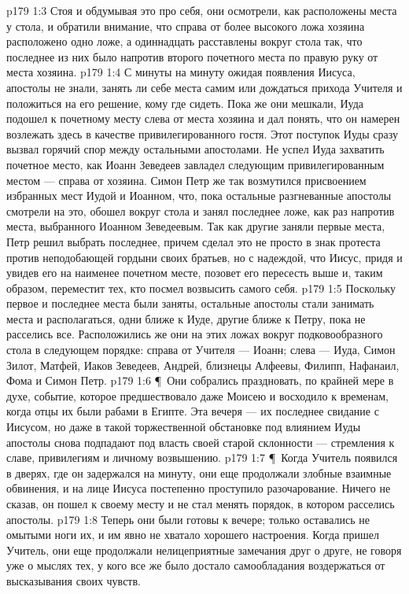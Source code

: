 \vs p179 1:3 Стоя и обдумывая это про себя, они осмотрели, как расположены места у стола, и обратили внимание, что справа от более высокого ложа хозяина расположено одно ложе, а одиннадцать расставлены вокруг стола так, что последнее из них было напротив второго почетного места по правую руку от места хозяина.
\vs p179 1:4 С минуты на минуту ожидая появления Иисуса, апостолы не знали, занять ли себе места самим или дождаться прихода Учителя и положиться на его решение, кому где сидеть. Пока же они мешкали, Иуда подошел к почетному месту слева от места хозяина и дал понять, что он намерен возлежать здесь в качестве привилегированного гостя. Этот поступок Иуды сразу вызвал горячий спор между остальными апостолами. Не успел Иуда захватить почетное место, как Иоанн Зеведеев завладел следующим привилегированным местом --- справа от хозяина. Симон Петр же так возмутился присвоением избранных мест Иудой и Иоанном, что, пока остальные разгневанные апостолы смотрели на это, обошел вокруг стола и занял последнее ложе, как раз напротив места, выбранного Иоанном Зеведеевым. Так как другие заняли первые места, Петр решил выбрать последнее, причем сделал это не просто в знак протеста против неподобающей гордыни своих братьев, но с надеждой, что Иисус, придя и увидев его на наименее почетном месте, позовет его пересесть выше и, таким образом, переместит тех, кто посмел возвысить самого себя.
\vs p179 1:5 Поскольку первое и последнее места были заняты, остальные апостолы стали занимать места и располагаться, одни ближе к Иуде, другие ближе к Петру, пока не расселись все. Расположились же они на этих ложах вокруг подковообразного стола в следующем порядке: справа от Учителя --- Иоанн; слева --- Иуда, Симон Зилот, Матфей, Иаков Зеведеев, Андрей, близнецы Алфеевы, Филипп, Нафанаил, Фома и Симон Петр.
\vs p179 1:6 \P\ Они собрались праздновать, по крайней мере в духе, событие, которое предшествовало даже Моисею и восходило к временам, когда отцы их были рабами в Египте. Эта вечеря --- их последнее свидание с Иисусом, но даже в такой торжественной обстановке под влиянием Иуды апостолы снова подпадают под власть своей старой склонности --- стремления к славе, привилегиям и личному возвышению.
\vs p179 1:7 \P\ Когда Учитель появился в дверях, где он задержался на минуту, они еще продолжали злобные взаимные обвинения, и на лице Иисуса постепенно проступило разочарование. Ничего не сказав, он пошел к своему месту и не стал менять порядок, в котором расселись апостолы.
\vs p179 1:8 Теперь они были готовы к вечере; только оставались не омытыми ноги их, и им явно не хватало хорошего настроения. Когда пришел Учитель, они еще продолжали нелицеприятные замечания друг о друге, не говоря уже о мыслях тех, у кого все же было достало самообладания воздержаться от высказывания своих чувств.
